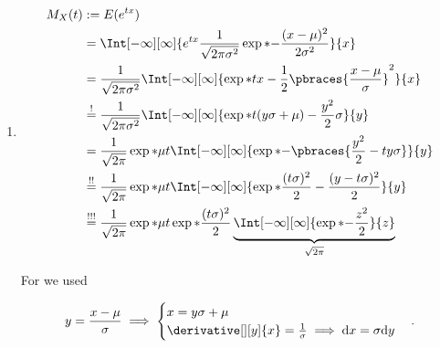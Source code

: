 \begin{solution}

\phantom{}

\begin{enumerate}[label = (\alph*)]

    \item

    \begin{align*}
        M_X(t)
        & :=
        E(e^{t x}) \\
        & =
        \Int[-\infty][\infty]
        {
            e^{t x}
            \frac{1}{\sqrt{2 \pi \sigma^2}}
            \exp*{-\frac{(x - \mu)^2}{2 \sigma^2}}
        }{x} \\
        & =
        \frac{1}{\sqrt{2 \pi \sigma^2}}
        \Int[-\infty][\infty]
        {
            \exp*
            {
                t x
                -
                \frac{1}{2} \pbraces{\frac{x - \mu}{\sigma}}^2
            }
        }{x} \\
        & \stackrel{!}{=}
        \frac{1}{\sqrt{2 \pi \sigma^2}}
        \Int[-\infty][\infty]
        {
            \exp*
            {
                t (y \sigma + \mu)
                -
                \frac{y^2}{2}
            }
            \sigma
        }{y} \\
        & =
        \frac{1}{\sqrt{2 \pi}}
        \exp*{\mu t}
        \Int[-\infty][\infty]
        {
            \exp*{-\pbraces{\frac{y^2}{2} - t y \sigma}}
        }{y} \\
        & \stackrel{!!}{=}
        \frac{1}{\sqrt{2 \pi}}
        \exp*{\mu t}
        \Int[-\infty][\infty]
        {
            \exp*
            {
                \frac{(t \sigma)^2}{2}
                -
                \frac{(y - t \sigma)^2}{2}
            }
        }{y} \\
        & \stackrel{!!!}{=}
        \frac{1}{\sqrt{2 \pi}}
        \exp*{\mu t}
        \exp*{\frac{(t \sigma)^2}{2}}
        \underbrace
        {
            \Int[-\infty][\infty]
            {
                \exp*{-\frac{z^2}{2}}
            }{z}
        }_{
            \sqrt{2 \pi}
        }
        \end{align*}

        For \Quote{!} we used

        \begin{align*}
            y = \frac{x - \mu}{\sigma}
            \implies
            \begin{cases}
                x = y \sigma + \mu \\
                \derivative[][y]{x} = \frac{1}{\sigma} \implies \mathrm d x = \sigma \mathrm d y
            \end{cases}.
        \end{align*}


\end{enumerate}
\end{solution}
